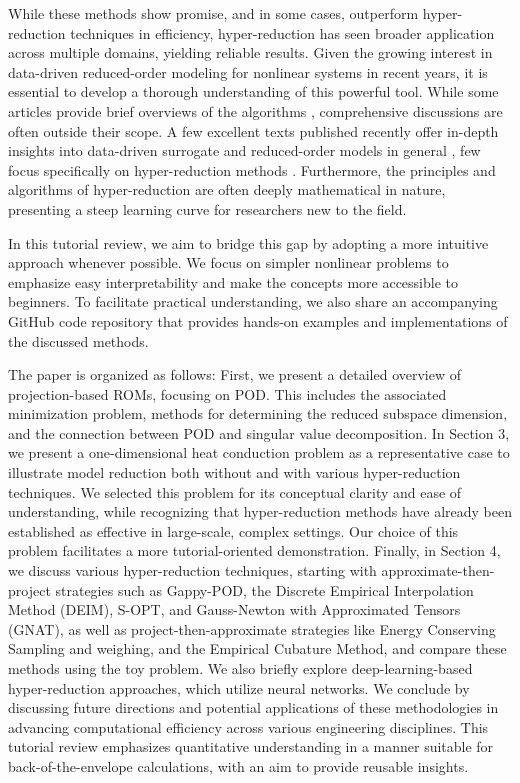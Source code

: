 \documentclass[11pt]{article}
\begin{document}
While these methods show promise, and in some cases, outperform hyper-reduction techniques in efficiency, hyper-reduction has seen broader application across multiple domains, yielding reliable results.
Given the growing interest in data-driven reduced-order modeling for nonlinear systems in recent years, it is essential to develop a thorough understanding of this powerful tool.
While some articles provide brief overviews of the algorithms \cite{kim2021improved}, comprehensive discussions are often outside their scope.
A few excellent texts published recently offer in-depth insights into data-driven surrogate and reduced-order models in general \cite{benner_2021,brunton2019data-driven,ghattas2021learning,fu2018pod}, few focus specifically on hyper-reduction methods \cite{Nguyen2024}.
Furthermore, the principles and algorithms of hyper-reduction are often deeply mathematical in nature, presenting a steep learning curve for researchers new to the field.


In this tutorial review, we aim to bridge this gap by adopting a more intuitive approach whenever possible.
We focus on simpler nonlinear problems to emphasize easy interpretability and make the concepts more accessible to beginners.
To facilitate practical understanding, we also share an accompanying GitHub code repository that provides hands-on examples and implementations of the discussed methods.


The paper is organized as follows: First, %
we present a detailed overview of projection-based ROMs, focusing on POD.
This includes the associated minimization problem, methods for determining the reduced subspace dimension, and the connection between POD and singular value decomposition.
In Section 3, we present a one-dimensional heat conduction problem as a representative case to illustrate model reduction both without and with various hyper-reduction techniques.
We selected this problem for its conceptual clarity and ease of understanding, while recognizing that hyper-reduction methods have already been established as effective in large-scale, complex settings.
Our choice of this problem facilitates a more tutorial-oriented demonstration.
Finally, in Section 4, we discuss various hyper-reduction techniques, starting with approximate-then-project strategies such as Gappy-POD, the Discrete Empirical Interpolation Method (DEIM), S-OPT, and Gauss-Newton with Approximated Tensors (GNAT), as well as project-then-approximate strategies like Energy Conserving Sampling and weighing, and the Empirical Cubature Method, and compare these methods using the toy problem.
We also briefly explore deep-learning-based hyper-reduction approaches, which utilize neural networks.
We conclude by discussing future directions and potential applications of these methodologies in advancing computational efficiency across various engineering disciplines.
This tutorial review emphasizes quantitative understanding in a manner suitable for back-of-the-envelope calculations, with an aim to provide reusable insights.
\end{document}
